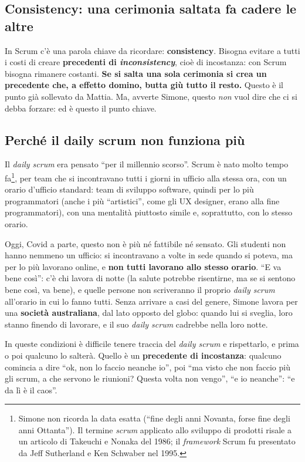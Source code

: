\subsection{Consistency: una cerimonia saltata fa cadere le altre}

In Scrum c'è una parola chiave da ricordare: \textbf{consistency}. Bisogna
evitare a tutti i costi di creare \textbf{precedenti di
\emph{inconsistency}}, cioè di incostanza: con Scrum bisogna rimanere
costanti. \textbf{Se si salta una sola cerimonia si crea un precedente che,
a effetto domino, butta giù tutto il resto.} Questo è il punto già sollevato
da Mattia. Ma, avverte Simone, questo \emph{non} vuol dire che ci si debba
forzare: ed è questo il punto chiave.

\subsection{Perché il daily scrum non funziona più}

Il \emph{daily scrum} era pensato ``per il millennio scorso''. Scrum è nato
molto tempo fa\footnote{Simone non ricorda la data esatta (``fine degli anni
Novanta, forse fine degli anni Ottanta''). Il termine \emph{scrum} applicato
allo sviluppo di prodotti risale a un articolo di Takeuchi e Nonaka del 1986;
il \emph{framework} Scrum fu presentato da Jeff Sutherland e Ken Schwaber nel
1995.}, per team che si incontravano tutti i giorni in ufficio alla stessa
ora, con un orario d'ufficio standard: team di sviluppo software, quindi per
lo più programmatori (anche i più ``artistici'', come gli UX designer, erano
alla fine programmatori), con una mentalità piuttosto simile e, soprattutto,
con lo stesso orario.

Oggi, Covid a parte, questo non è più né fattibile né sensato. Gli studenti
non hanno nemmeno un ufficio: si incontravano a volte in sede quando si
poteva, ma per lo più lavorano online, e \textbf{non tutti lavorano allo
stesso orario}. ``E va bene così'': c'è chi lavora di notte (la salute
potrebbe risentirne, ma se si sentono bene così, va bene), e quelle persone
non scriveranno il proprio \emph{daily scrum} all'orario in cui lo fanno
tutti. Senza arrivare a casi del genere, Simone lavora per una
\textbf{società australiana}, dal lato opposto del globo: quando lui si
sveglia, loro stanno finendo di lavorare, e il suo \emph{daily scrum} cadrebbe
nella loro notte.

In queste condizioni è difficile tenere traccia del \emph{daily scrum} e
rispettarlo, e prima o poi qualcuno lo salterà. Quello è un
\textbf{precedente di incostanza}: qualcuno comincia a dire ``ok, non lo faccio
neanche io'', poi ``ma visto che non faccio più gli scrum, a che servono le
riunioni? Questa volta non vengo'', ``e io neanche'': ``e da lì è il caos''.

